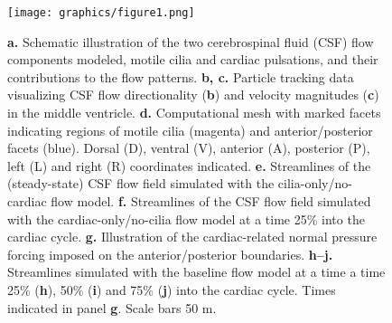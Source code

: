 \documentclass{WileyMSP-template}
\begin{document}
\begin{figure}
    \centering
    \texttt{[image: graphics/figure1.png]}
    \caption{
    \textbf{a.} Schematic illustration of the two cerebrospinal fluid (CSF) flow components modeled,
    motile cilia and cardiac pulsations, and their contributions to the flow patterns.
    \textbf{b, c.} Particle tracking data visualizing CSF flow directionality (\textbf{b}) and
    velocity magnitudes (\textbf{c}) in the middle ventricle.
    \textbf{d.} Computational mesh with marked facets indicating regions of motile cilia (magenta) and
    anterior/posterior facets (blue). Dorsal (D), ventral (V), anterior (A), posterior (P),
    left (L) and right (R) coordinates indicated.
    \textbf{e.} Streamlines of the (steady-state) CSF flow field simulated with the
    cilia-only/no-cardiac flow model.
    \textbf{f.} Streamlines of the CSF flow field simulated with the cardiac-only/no-cilia flow
    model at a time 25\% into the cardiac cycle. %
    \textbf{g.} Illustration of the cardiac-related normal pressure forcing imposed on the
    anterior/posterior boundaries.
    \textbf{h--j.} Streamlines simulated with the baseline flow model at
    a time a time 25\% (\textbf{h}), 50\% (\textbf{i}) and 75\% (\textbf{j})
    into the cardiac cycle. Times indicated in panel \textbf{g}.
    Scale bars 50 \textmu m.
    }
    \label{fig:fig1}
\end{figure}







\end{document}

